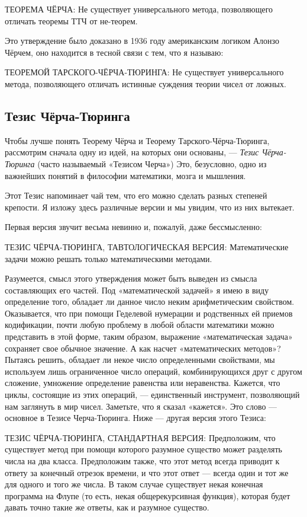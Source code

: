 \documentclass[../main.tex]{subfiles}
\begin{document}
ТЕОРЕМА ЧЁРЧА: Не существует универсального метода, позволяющего отличать теоремы ТТЧ от не-теорем.

Это утверждение было доказано в 1936 году американским логиком Алонзо Чёрчем, оно находится в тесной связи с тем, что я называю:

ТЕОРЕМОЙ ТАРСКОГО-ЧЁРЧА-ТЮРИНГА: Не существует универсального метода, позволяющего отличать истинные суждения теории чисел от ложных.


\subsection{Тезис Чёрча-Тюринга}

Чтобы лучше понять Теорему Чёрча и Теорему Тарского-Чёрча-Тюринга, рассмотрим сначала одну из идей, на которых они основаны, --- \emph{Тезис Чёрча-Тюринга} (часто называемый «Тезисом Черча») Это, безусловно, одно из важнейших понятий в философии математики, мозга и мышления.

Этот Тезис напоминает чай тем, что его можно сделать разных степеней крепости. Я изложу здесь различные версии и мы увидим, что из них вытекает.

Первая версия звучит весьма невинно и, пожалуй, даже бессмысленно:

ТЕЗИС ЧЁРЧА-ТЮРИНГА, ТАВТОЛОГИЧЕСКАЯ ВЕРСИЯ: Математические задачи можно решать только математическими методами.

Разумеется, смысл этого утверждения может быть выведен из смысла составляющих его частей. Под «математической задачей» я имею в виду определение того, обладает ли данное число неким арифметическим свойством. Оказывается, что при помощи Геделевой нумерации и родственных ей приемов кодификации, почти любую проблему в любой области математики можно представить в этой форме, таким образом, выражение «математическая задача» сохраняет свое обычное значение. А как насчет «математических методов»? Пытаясь решить, обладает ли некое число определенными свойствами, мы используем лишь ограниченное число операций, комбинирующихся друг с другом сложение, умножение определение равенства или неравенства. Кажется, что циклы, состоящие из этих операций, --- единственный инструмент, позволяющий нам заглянуть в мир чисел. Заметьте, что я сказал «кажется». Это слово --- основное в Тезисе Черча-Тюринга. Ниже --- другая версия этого Тезиса:

ТЕЗИС ЧЁРЧА-ТЮРИНГА, СТАНДАРТНАЯ ВЕРСИЯ: Предположим, что существует метод при помощи которого разумное существо может разделять числа на два класса. Предположим также, что этот метод всегда приводит к ответу за конечный отрезок времени, и что этот ответ --- всегда один и тот же для одного и того же числа. В таком случае существует некая конечная программа на Флупе (то есть, некая общерекурсивная функция), которая будет давать точно такие же ответы, как и разумное существо.
\end{document}
